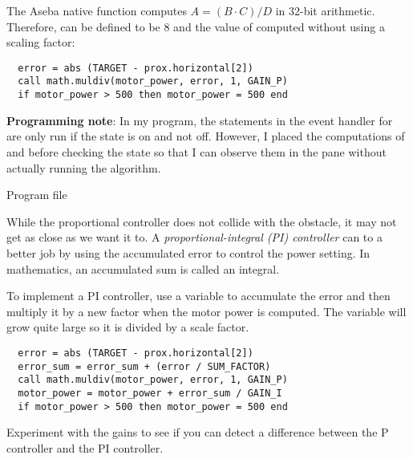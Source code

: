 The Aseba native function  computes $A = (B
\cdot C) / D$ in 32-bit arithmetic. Therefore,  can be
defined to be 8 and the value of  computed without using
a scaling factor:

\begin{verbatim}
  error = abs (TARGET - prox.horizontal[2])
  call math.muldiv(motor_power, error, 1, GAIN_P)
  if motor_power > 500 then motor_power = 500 end
\end{verbatim}

\textbf{Programming note}: In my program, the statements in the event
handler for  are only run if the state is on and not off.
However, I placed the computations of  and 
before checking the state so that I can observe them in the
 pane without actually running the algorithm.


{\raggedleft \hfill Program file }

While the proportional controller does not collide with the obstacle, it
may not get as close as we want it to. A \emph{proportional-integral
(PI) controller} can to a better job by using the accumulated error to
control the power setting. In mathematics, an accumulated sum is called
an integral.

To implement a PI controller, use a variable to accumulate
the error and then multiply it by a new factor  when the
motor power is computed. The variable  will grow quite
large so it is divided by a scale factor.

\begin{verbatim}
  error = abs (TARGET - prox.horizontal[2])
  error_sum = error_sum + (error / SUM_FACTOR)
  call math.muldiv(motor_power, error, 1, GAIN_P)
  motor_power = motor_power + error_sum / GAIN_I
  if motor_power > 500 then motor_power = 500 end
\end{verbatim}

Experiment with the gains to see if you can detect a difference between
the P controller and the PI controller.
